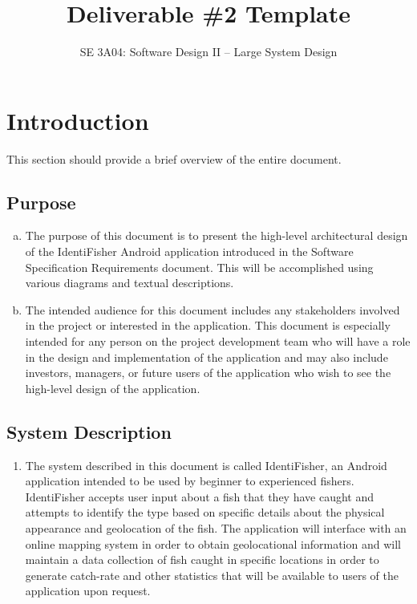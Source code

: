 \documentclass[]{article}
\title{Deliverable \#2 Template}
\author{SE 3A04: Software Design II -- Large System Design}
\date{}
\begin{document}
\maketitle	

\section{Introduction}
\label{sec:introduction}

This section should provide a brief overview of the entire document.

\subsection{Purpose}
\label{sub:purpose}
\begin{enumerate}[a)]
	\item
	The purpose of this document is to present the high-level architectural design of the IdentiFisher Android application introduced in the Software Specification Requirements document. This will be accomplished using various diagrams and textual descriptions.
	\item 
	The intended audience for this document includes any stakeholders involved in the project or interested in the application. This document is especially intended for any person on the project development team who will have a role in the design and implementation of the application and may also include investors, managers, or future users of the application who wish to see the high-level design of the application.  
\end{enumerate}

\subsection{System Description}
\label{sub:system_description}
\begin{enumerate}[]
	\item 
	The system described in this document is called IdentiFisher, an Android application intended to be used by beginner to experienced fishers. IdentiFisher accepts user input about a fish that they have caught and attempts to identify the type based on specific details about the physical appearance and geolocation of the fish. The application will interface with an online mapping system in order to obtain geolocational information and will maintain a data collection of fish caught in specific locations in order to generate catch-rate and other statistics that will be available to users of the application upon request. 
\end{enumerate}
\end{document}
